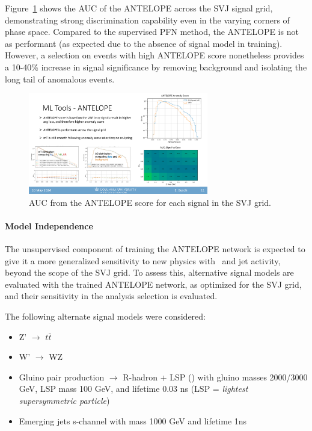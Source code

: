 Figure~\ref{fig:antelope_AUC_score_grid} shows the AUC of the ANTELOPE across the SVJ signal grid, demonstrating strong discrimination capability even in the varying corners of phase space. 
Compared to the supervised PFN method, the ANTELOPE is not as performant (as expected due to the absence of signal model in training).
However, a selection on events with high ANTELOPE score nonetheless provides a 10-40\% increase in signal significance by removing background and isolating the long tail of anomalous events.

\begin{figure}[!htbp]
\centering
   \includegraphics[width=0.7\textwidth]{figures/ml/antelope_AUC_score_grid}
    \caption{AUC from the ANTELOPE score for each signal in the SVJ grid.
    \label{fig:antelope_AUC_score_grid}}
\end{figure}

\paragraph{Model Independence} 

The unsupervised component of training the ANTELOPE network is expected to give it a more generalized sensitivity to new physics with \met~and jet activity, beyond the scope of the SVJ grid. 
To assess this, alternative signal models are evaluated with the trained ANTELOPE network, as optimized for the SVJ grid, and their sensitivity in the analysis selection is evaluated.

The following alternate signal models were considered: 
\begin{itemize}
\item Z' $\rightarrow$ $t\bar{t}$ 
\item W' $\rightarrow$ WZ 
\item Gluino pair production $\rightarrow$ R-hadron + LSP (\met) with gluino masses 2000/3000 GeV, LSP mass 100 GeV, and lifetime 0.03 ns (LSP = \textit{lightest supersymmetric particle})
\item Emerging jets s-channel with mass 1000 GeV and lifetime 1ns 
\end{itemize}

